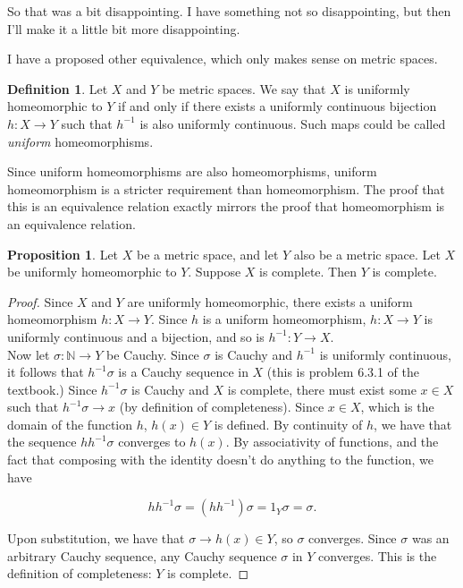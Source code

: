 \documentclass[11pt]{article}
\newcommand{\N}{\mathbb{N}}
\newcommand{\inv}[1]{{#1}^{-1}}
\theoremstyle{definition}
\newtheorem*{definition}{Definition}
\newtheorem{proposition}{Proposition}
\begin{document}
So that was a bit disappointing. I have something not so disappointing, but then I'll make it a little bit more disappointing.

I have a proposed other equivalence, which only makes sense on metric spaces.
\begin{definition}
Let $X$ and $Y$ be metric spaces. We say that $X$ is uniformly homeomorphic to $Y$ if and only if there exists a uniformly continuous bijection $h:X\to Y$ such that $\inv{h}$ is also uniformly continuous. Such maps could be called \textit{uniform} homeomorphisms. 
\end{definition}

Since uniform homeomorphisms are also homeomorphisms, uniform homeomorphism is a stricter requirement than homeomorphism. The proof that this is an equivalence relation exactly mirrors the proof that homeomorphism is an equivalence relation.

\begin{proposition}
Let $X$ be a metric space, and let $Y$ also be a metric space. Let $X$ be uniformly homeomorphic to $Y$. Suppose $X$ is complete. Then $Y$ is complete.
\end{proposition}

\begin{proof}
Since $X$ and $Y$ are uniformly homeomorphic, there exists a uniform homeomorphism $h:X\to Y$. Since $h$ is a uniform homeomorphism, $h:X\to Y$ is uniformly continuous and a bijection, and so is $\inv{h}:Y\to X$.\\

Now let $\sigma : \N\to Y$ be Cauchy. Since $\sigma$ is Cauchy and $\inv{h}$ is uniformly continuous, it follows that $\inv{h}\sigma$ is a Cauchy sequence in $X$ (this is problem 6.3.1 of the textbook.) Since $\inv{h}\sigma$ is Cauchy and $X$ is complete, there must exist some $x\in X$ such that $\inv{h}\sigma\to x$ (by definition of completeness). Since $x\in X$, which is the domain of the function $h$, $h(x)\in Y$ is defined. By continuity of $h$, we have that the sequence $h\inv{h}\sigma$ converges to $h(x)$. By associativity of functions, and the fact that composing with the identity doesn't do anything to the function, we have

\[h\inv{h}\sigma = (h\inv{h})\sigma = 1_Y\sigma = \sigma.\] 

Upon substitution, we have that $\sigma\to h(x)\in Y$, so $\sigma$ converges. Since $\sigma$ was an arbitrary Cauchy sequence, any Cauchy sequence $\sigma$ in $Y$ converges. This is the definition of completeness: $Y$ is complete.
\end{proof}
\end{document}

